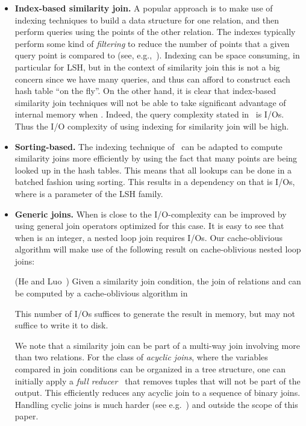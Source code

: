 \documentclass{llncs}
\begin{document}
\begin{itemize}
	\item \textbf{Index-based similarity join.}
A popular approach is to make use of indexing techniques to build a data structure for one relation, and then perform queries using the points of the other relation.
The indexes typically perform some kind of \emph{filtering} to reduce the number of points that a given query point is compared to (see, e.g.,~\cite{Bayardo_WWW07,Chaudhuri_ICDE06,Gionis_VLDB99}).
Indexing can be space consuming, in particular for LSH, but in the context of similarity join this is not a big concern since we have many queries, and thus can afford to construct each hash table ``on the fly''.
On the other hand, it is clear that index-based similarity join techniques will not be able to take significant advantage of internal memory when .
Indeed, the query complexity stated in~\cite{Gionis_VLDB99} is  I/Os.
Thus the I/O complexity of using indexing for similarity join will be high.
\item \textbf{Sorting-based.}\label{sec:sorting}
The indexing technique of~\cite{Gionis_VLDB99} can be adapted to compute similarity joins more efficiently by using the fact that many points are being looked up in the hash tables.
This means that all lookups can be done in a batched fashion using sorting.
This results in a dependency on  that is  I/Os, where  is a parameter of the LSH family.
\item \textbf{Generic joins.}\label{sec:generic}
When  is close to  the I/O-complexity can be improved by using general join operators optimized for this case.
It is easy to see that when  is an integer, a nested loop join requires  I/Os.
Our cache-oblivious algorithm will make use of the following result on cache-oblivious nested loop joins:

\begin{theorem}(He and Luo~\cite{he2006cache})\label{thm:co-nested-loop}
	Given a similarity join condition, the join of relations  and  can be computed by a cache-oblivious algorithm in
	 
		This number of I/Os suffices to generate the result in memory, but may not suffice to write it to disk.
\end{theorem}

We note that a similarity join can be part of a multi-way join involving more than two relations. For the class of \emph{acyclic joins}, where the variables compared in join conditions can be organized in a tree structure, one can initially apply a \emph{full reducer}~\cite{Yannakakis_VLDB81} that removes tuples that will not be part of the output. This efficiently reduces any acyclic join to a sequence of binary joins. Handling cyclic joins is much harder (see e.g.~\cite{Ngo_SIGMOD13}) and outside the scope of this paper.

\end{itemize}
\end{document}
